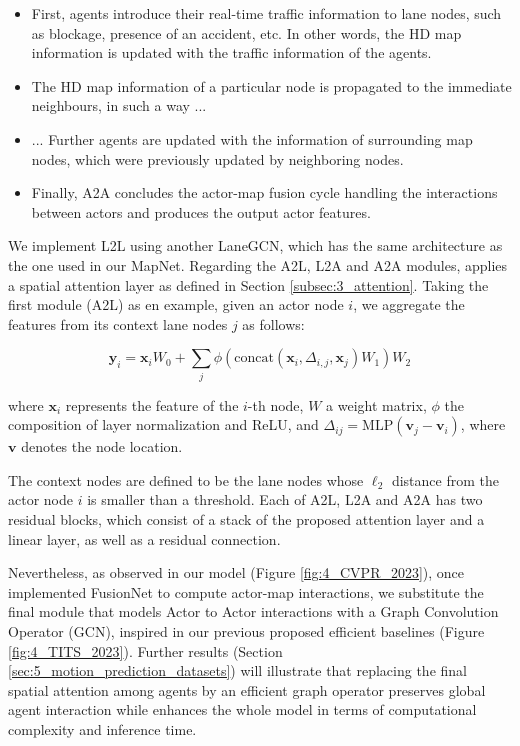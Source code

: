 \begin{itemize}
	\item First, agents introduce their real-time traffic information to lane nodes, such as blockage, presence of an accident, etc. In other words, the HD map information is updated with the traffic information of the agents.
	\item The HD map information of a particular node is propagated to the immediate neighbours, in such a way ...
	\item ... Further agents are updated with the information of surrounding map nodes, which were previously updated by neighboring nodes.
	\item Finally, A2A concludes the actor-map fusion cycle handling the interactions between actors and produces the output actor features.
	
\end{itemize}

We implement L2L using another LaneGCN, which has the same architecture as the one used in our MapNet. Regarding the A2L, L2A and A2A modules, \cite{liang2020learning} applies a spatial attention layer as defined in Section \ref{subsec:3_attention}. Taking the first module (A2L) as en example, given an actor node $i$, we aggregate the features from its context lane nodes $j$ as follows:

\begin{equation}
	\mathbf{y}_i = \mathbf{x}_i W_0 + \sum_j \phi ( \text{concat} (\mathbf{x}_i, \Delta_{i,j}, \mathbf{x}_j) W_1) W_2
	\label{equ:attention}
\end{equation}

where $\mathbf{x}_i$ represents the feature of the $i$-th node, $W$ a weight matrix, $\phi$ the composition of layer normalization and ReLU, and $\Delta_{ij} = \text{MLP}(\mathbf{v}_j - \mathbf{v}_i)$, where $\mathbf{v}$ denotes the node location.

The context nodes are defined to be the lane nodes whose $\ell_2$ distance from the actor node $i$ is smaller than a threshold. Each of A2L, L2A and A2A has two residual blocks, which consist of a stack of the proposed attention layer and a linear layer, as well as a residual connection. 

Nevertheless, as observed in our model (Figure \ref{fig:4_CVPR_2023}), once implemented FusionNet to compute actor-map interactions, we substitute the final module that models Actor to Actor interactions with a Graph Convolution Operator (GCN), inspired in our previous proposed efficient baselines (Figure \ref{fig:4_TITS_2023}). Further results (Section \ref{sec:5_motion_prediction_datasets}) will illustrate that replacing the final spatial attention among agents by an efficient graph operator preserves global agent interaction while enhances the whole model in terms of computational complexity and inference time.

